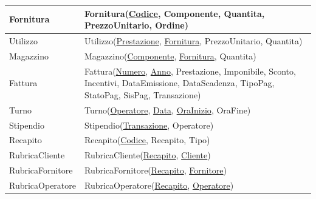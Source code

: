 \begin{longtable}{| p{3cm} | p{11.5cm} |}
				\hline
			Fornitura & 
				Fornitura(\underline{Codice}, Componente, Quantita, PrezzoUnitario, Ordine) \\
				\hline
			Utilizzo &
				Utilizzo(\underline{Prestazione}, \underline{Fornitura}, PrezzoUnitario, Quantita) \\
				\hline
			Magazzino &
				Magazzino(\underline{Componente}, \underline{Fornitura}, Quantita) \\
				\hline
			Fattura &
				Fattura(\underline{Numero}, \underline{Anno}, Prestazione, Imponibile, Sconto, Incentivi, DataEmissione, DataScadenza, TipoPag, StatoPag, SisPag, Transazione) \\
				\hline
			Turno & 
				Turno(\underline{Operatore}, \underline{Data}, \underline{OraInizio}, OraFine) \\
				\hline
			Stipendio &
				Stipendio(\underline{Transazione}, Operatore) \\
				\hline
			Recapito &
				Recapito(\underline{Codice}, Recapito, Tipo) \\
				\hline
			RubricaCliente &
				RubricaCliente(\underline{Recapito}, \underline{Cliente}) \\
				\hline
			RubricaFornitore &
				RubricaFornitore(\underline{Recapito}, \underline{Fornitore}) \\
				\hline
			RubricaOperatore &
				RubricaOperatore(\underline{Recapito}, \underline{Operatore}) \\
				\hline

		\end{longtable}
	\vspace{2ex}

